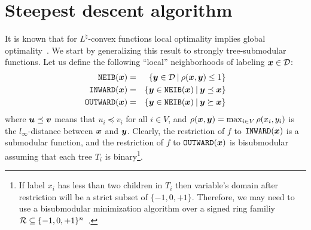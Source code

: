 \documentclass[11pt,onecolumn]{article}
\def\D{{\cal D}}
\def\calR{{\cal R}}
\def\INWARD{\texttt{INWARD}}
\def\OUTWARD{\texttt{OUTWARD}}
\def\NEIB{\texttt{NEIB}}
\newcommand{\bx}{\mbox{\boldmath $x$}}
\newcommand{\by}{\mbox{\boldmath $y$}}
\newcommand{\bu}{\mbox{\boldmath $u$}}
\newcommand{\bv}{\mbox{\boldmath $v$}}
\begin{document}
\section{Steepest descent algorithm}\label{sec:alg}

It is known that for $L^\natural$-convex functions local optimality implies global optimality~\cite{Murota:book}.
We start by generalizing this result to strongly tree-submodular functions. 
Let us define the following ``local'' neighborhoods of labeling $\bx\in \D$:
\begin{eqnarray*}
\NEIB(\bx)    & = & \{\by\in \D\:|\: \rho(\bx,\by)\le 1 \} \\
\INWARD(\bx)  & = & \{\by\in \NEIB(\bx) \:|\: \by \preceq \bx \} \\
\OUTWARD(\bx) & = & \{\by\in \NEIB(\bx) \:|\:  \by \succeq \bx \} \\
\end{eqnarray*}
where $\bu\preceq\bv$ means that $u_i\preceq v_i$ for all $i\in V$, and $\rho(\bx,\by)=\max_{i\in V}\rho(x_i,y_i)$ is the $l_\infty$-distance between $\bx$ and $\by$.
Clearly, the restriction of $f$ to $\INWARD(\bx)$ is a submodular function,
and the restriction of $f$ to $\OUTWARD(\bx)$ is bisubmodular assuming that each tree $T_i$ is binary\footnote{If label $x_i$
has less than two children in $T_i$ then variable's domain after restriction will be a strict subset of $\{-1,0,+1\}$.
Therefore, we may need to use a bisubmodular minimization algorithm over a signed ring familiy $\calR\subseteq\{-1,0,+1\}^n$~\cite{McCormick:10}.}.
\end{document}
